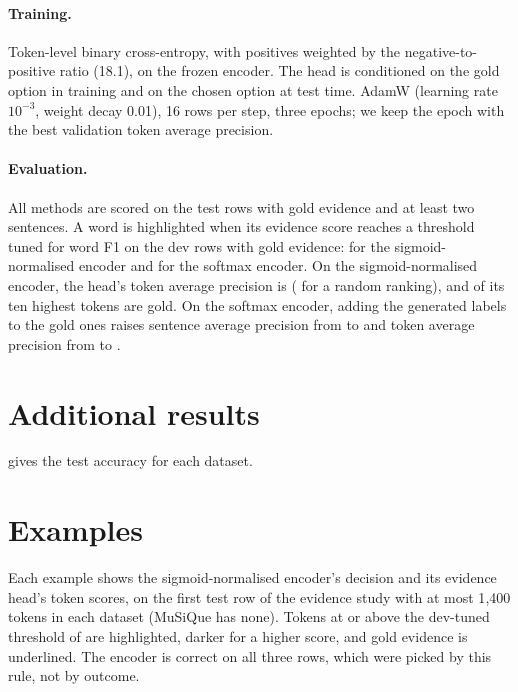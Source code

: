 \paragraph{Training.}
Token-level binary cross-entropy, with positives weighted by the negative-to-positive ratio (18.1), on the frozen encoder.
The head is conditioned on the gold option in training and on the chosen option at test time.
AdamW (learning rate $10^{-3}$, weight decay 0.01), 16 rows per step, three epochs; we keep the epoch with the best validation token average precision.

\paragraph{Evaluation.}
All methods are scored on the test rows with gold evidence and at least two sentences.
A word is highlighted when its evidence score reaches a threshold tuned for word F1 on the \EvTuneRows{} dev rows with gold evidence: \EvThrSig{} for the sigmoid-normalised encoder and \EvThrList{} for the softmax encoder.
On the sigmoid-normalised encoder, the head's token average precision is \EvTokAPSig{} (\EvChanceSig{} for a random ranking), and \EvPTenSig{} of its ten highest tokens are gold.
On the softmax encoder, adding the generated labels to the gold ones raises sentence average precision from \EvSentAPGold{} to \EvSentAPList{} and token average precision from \EvTokAPGold{} to \EvTokAPList{}.

\section{Additional results}
\label{app:extra}

 gives the test accuracy for each dataset.

\begin{table}[h]
  \centering\small
  \setlength{\tabcolsep}{4pt}
  \caption{Test accuracy (\%) per dataset, averaged over training runs. UB is UltraBERT-380M: UB yes is the softmax over each option's ``yes'' logit; UB yes$-$no is the softmax over ``yes'' minus ``no''; UB sqrt-sp and UB sig-norm normalise ``yes'' minus ``no'' with the square-root softplus and the sigmoid, each divided by the sum over options (\cref{sec:loss}). Bold: best below 1B parameters.}
  \label{tab:perdataset}
  
\end{table}

\section{Examples}
\label{app:examples}

Each example shows the sigmoid-normalised encoder's decision and its evidence head's token scores, on the first test row of the evidence study with at most 1{,}400 tokens in each dataset (MuSiQue has none).
Tokens at or above the dev-tuned threshold of \EvThrSig{} are highlighted, darker for a higher score, and gold evidence is underlined.
The encoder is correct on all three rows, which were picked by this rule, not by outcome.


